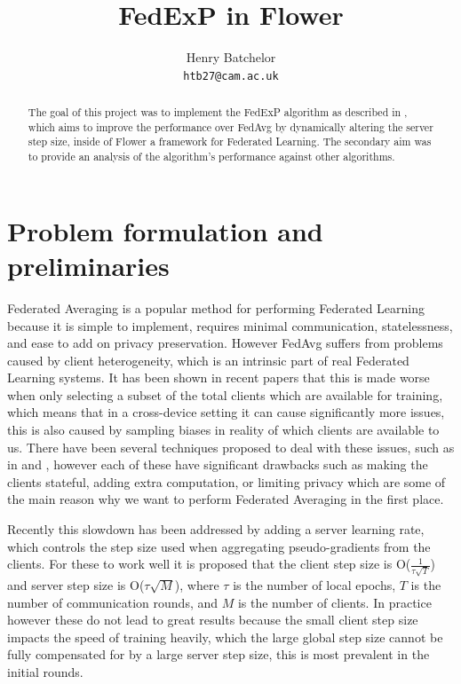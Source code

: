 \documentclass{article}
\title{FedExP in Flower}
\author{%
  Henry Batchelor\\
  \texttt{htb27@cam.ac.uk} \\
}
\begin{document}
\maketitle

\begin{abstract}
  The goal of this project was to implement the FedExP algorithm as described in \cite{FedExP}, which aims to improve the performance over FedAvg by dynamically altering the server step size, inside of Flower \cite{flower} a framework for Federated Learning.  The secondary aim was to provide an analysis of the algorithm's performance against other algorithms.
\end{abstract}

\section{Problem formulation and preliminaries}

Federated Averaging is a popular method for performing Federated Learning because it is simple to implement, requires minimal communication, statelessness, and ease to add on privacy preservation.  However FedAvg suffers from problems caused by client heterogeneity, which is an intrinsic part of real Federated Learning systems.  It has been shown in recent papers \cite{FewerClientsWorseBehaviour} that this is made worse when only selecting a subset of the total clients which are available for training, which means that in a cross-device setting it can cause significantly more issues, this is also caused by sampling biases in reality of which clients are available to us.  There have been several techniques proposed to deal with these issues, such as in \cite{signSGD} and \cite{ProxSkip}, however each of these have significant drawbacks such as making the clients stateful, adding extra computation, or limiting privacy which are some of the main reason why we want to perform Federated Averaging in the first place.  

Recently this slowdown has been addressed by adding a server learning rate, which controls the step size used when aggregating pseudo-gradients from the clients. \cite{}  For these to work well it is proposed that the client step size is O($\frac{1}{\tau\sqrt{T}}$) and server step size is O($\tau\sqrt{M}$), where $\tau$ is the number of local epochs, $T$ is the number of communication rounds, and $M$ is the number of clients.  In practice however these do not lead to great results because the small client step size impacts the speed of training heavily, which the large global step size cannot be fully compensated for by a large server step size, this is most prevalent in the initial rounds.
\end{document}
